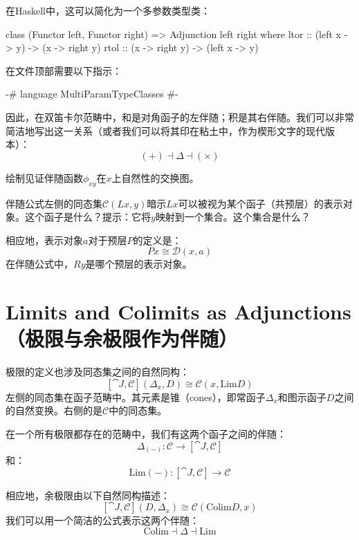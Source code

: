 \documentclass[DaoFP]{subfiles}
\begin{document}
    在Haskell中，这可以简化为一个多参数类型类：
    \begin{haskell}
        class (Functor left, Functor right) => Adjunction left right where
        ltor :: (left x -> y) -> (x -> right y)
        rtol :: (x -> right y) -> (left x -> y)
    \end{haskell}
    在文件顶部需要以下指示：
    \begin{haskell}
    {-# language MultiParamTypeClasses #-}
    \end{haskell}

    因此，在双笛卡尔范畴中，和是对角函子的左伴随；积是其右伴随。我们可以非常简洁地写出这一关系（或者我们可以将其印在粘土中，作为楔形文字的现代版本）：
    \[ (+) \dashv \Delta \dashv (\times) \]

    \begin{exercise}
        绘制见证伴随函数$\phi_{x y}$在$x$上自然性的交换图。
    \end{exercise}

    \begin{exercise}
        伴随公式左侧的同态集$\mathcal{C} (L x, y)$暗示$L x$可以被视为某个函子（共预层）的表示对象。这个函子是什么？提示：它将$y$映射到一个集合。这个集合是什么？
    \end{exercise}

    \begin{exercise}
        相应地，表示对象$a$对于预层$P$的定义是：
        \[P x \cong \mathcal{D}(x, a)\]
        在伴随公式中，$R y$是哪个预层的表示对象。
    \end{exercise}

    \section{Limits and Colimits as Adjunctions（极限与余极限作为伴随）}

    极限的定义也涉及同态集之间的自然同构：
    \[ [\cat J, \mathcal{C}](\Delta_x, D)  \cong \mathcal{C}(x, \text{Lim} D) \]
    左侧的同态集在函子范畴中。其元素是锥（cones），即常函子$\Delta_x$和图示函子$D$之间的自然变换。右侧的是$\mathcal{C}$中的同态集。

    在一个所有极限都存在的范畴中，我们有这两个函子之间的伴随：
    \[ \Delta_{(-)} \colon \mathcal{C} \to  [\cat J, \mathcal{C}] \]
    和：
    \[ \text{Lim}{(-)} \colon  [\cat J, \mathcal{C}] \to \mathcal{C} \]

    相应地，余极限由以下自然同构描述：
    \[ [\cat J, \mathcal{C}](D, \Delta_x)  \cong \mathcal{C}( \text{Colim} D, x) \]
    我们可以用一个简洁的公式表示这两个伴随：
    \[ \text{Colim} \dashv \Delta \dashv \text{Lim}\]
\end{document}
